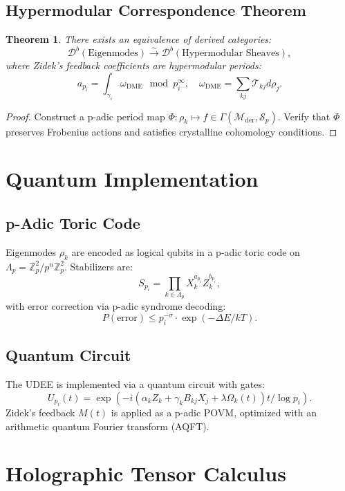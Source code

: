 \documentclass[11pt]{article}
\theoremstyle{plain}
\newtheorem{theorem}{Theorem}[section]
\theoremstyle{definition}
\begin{document}
\subsection{Hypermodular Correspondence Theorem}
\begin{theorem}
There exists an equivalence of derived categories:
\[
\mathscr{D}^b(\text{Eigenmodes}) \xrightarrow{\sim} \mathscr{D}^b(\text{Hypermodular Sheaves}),
\]
where Zidek’s feedback coefficients are hypermodular periods:
\[
a_{p_i} = \int_{\gamma_i} \omega_{\text{DME}} \mod p_i^{\infty}, \quad \omega_{\text{DME}} = \sum_{kj} \mathcal{T}_{kj} d\rho_j.
\]
\end{theorem}

\begin{proof}
Construct a p-adic period map \(\Phi : \rho_k \mapsto f \in \Gamma(\mathcal{M}_{\text{der}}, \mathcal{S}_p)\). Verify that \(\Phi\) preserves Frobenius actions and satisfies crystalline cohomology conditions.
\end{proof}

\section{Quantum Implementation}

\subsection{p-Adic Toric Code}
Eigenmodes \(\rho_k\) are encoded as logical qubits in a p-adic toric code on \(\Lambda_p = \mathbb{Z}_p^2 / p^n \mathbb{Z}_p^2\). Stabilizers are:
\[
S_{p_i} = \prod_{k \in \Lambda_p} X_k^{a_{p_i}} Z_k^{b_{p_i}},
\]
with error correction via p-adic syndrome decoding:
\[
P(\text{error}) \leq p_i^{-\sigma} \cdot \exp(-\Delta E / kT).
\]

\subsection{Quantum Circuit}
The UDEE is implemented via a quantum circuit with gates:
\[
U_{p_i}(t) = \exp\left(-i \left( \alpha_k Z_k + \gamma_k B_{kj} X_j + \lambda \Omega_k(t) \right) t / \log p_i \right).
\]
Zidek’s feedback \(M(t)\) is applied as a p-adic POVM, optimized with an arithmetic quantum Fourier transform (AQFT).

\section{Holographic Tensor Calculus}
\end{document}
